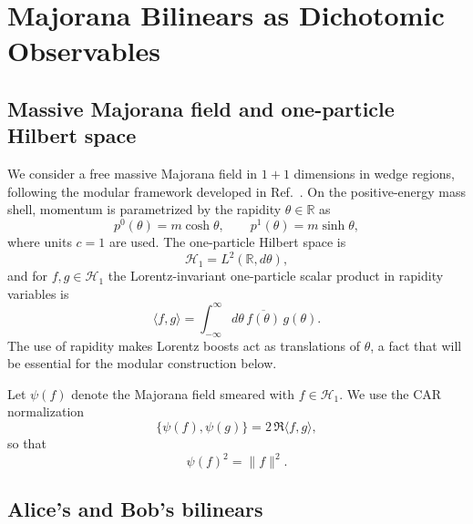 \documentclass[11pt]{article}
\begin{document}
\section{Majorana Bilinears as Dichotomic Observables}
\label{sec:bilinears}

\subsection{Massive Majorana field and one-particle Hilbert space}

We consider a free massive Majorana field in $1+1$ dimensions in wedge regions, following the modular framework developed in Ref.~\cite{CaribeMajorana2026}. On the positive-energy mass shell, momentum is parametrized by the rapidity $\theta\in\mathbb R$ as
\begin{equation}
 p^0(\theta)=m\cosh\theta,
 \qquad
 p^1(\theta)=m\sinh\theta,
 \label{eq:rapidity}
\end{equation}
where units $c=1$ are used. The one-particle Hilbert space is
\begin{equation}
 \mathcal H_1=L^2(\mathbb R,d\theta),
\end{equation}
and for $f,g\in\mathcal H_1$ the Lorentz-invariant one-particle scalar product in rapidity variables is
\begin{equation}
 \langle f,g\rangle
 =\int_{-\infty}^{\infty}d\theta\,
 \overline{f(\theta)}\,g(\theta).
 \label{eq:innerproducttheta}
\end{equation}
The use of rapidity makes Lorentz boosts act as translations of $\theta$, a fact that will be essential for the modular construction below.

Let $\psi(f)$ denote the Majorana field smeared with $f\in\mathcal H_1$. We use the CAR normalization
\begin{equation}
 \{\psi(f),\psi(g)\}=2\,\Re\langle f,g\rangle,
 \label{eq:CAR}
\end{equation}
so that
\begin{equation}
 \psi(f)^2=\|f\|^2.
 \label{eq:psisquare}
\end{equation}

\subsection{Alice's and Bob's bilinears}
\end{document}
